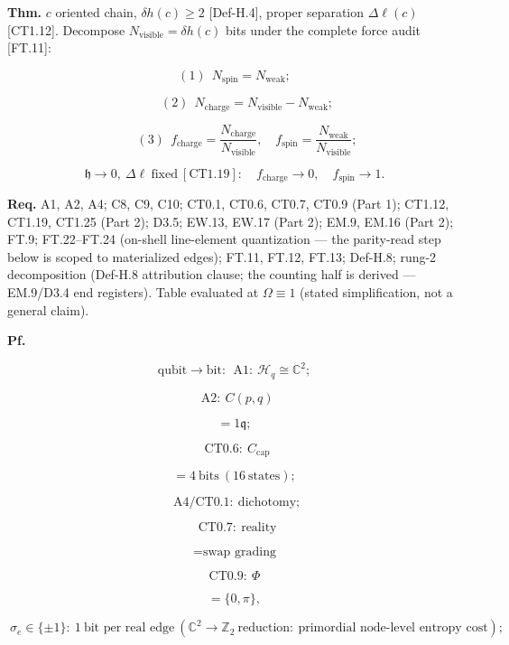 \begin{theorem}\label{tag:FT-14}
\textbf{Thm.} $c$ oriented chain, $\delta h(c)\ge2$ [Def-H.4], proper separation $\Delta\ell(c)$ [CT1.12]. Decompose $N_{\mathrm{visible}}=\delta h(c)$ bits under the complete force audit [FT.11]:

\[
(1)\ \ N_{\mathrm{spin}}=N_{\mathrm{weak}};
\]

\[
\qquad (2)\ \ N_{\mathrm{charge}}=N_{\mathrm{visible}}-N_{\mathrm{weak}};
\]

\[
\qquad (3)\ \ f_{\mathrm{charge}}=\frac{N_{\mathrm{charge}}}{N_{\mathrm{visible}}},\quad f_{\mathrm{spin}}=\frac{N_{\mathrm{weak}}}{N_{\mathrm{visible}}};
\]

\[
\mathfrak h\to0,\ \Delta\ell\ \text{fixed}\ [\mathrm{CT1.19}]:\quad f_{\mathrm{charge}}\to0,\quad f_{\mathrm{spin}}\to1 .
\]

\textbf{Req.} A1, A2, A4; C8, C9, C10; CT0.1, CT0.6, CT0.7, CT0.9 (Part 1); CT1.12, CT1.19, CT1.25 (Part 2); D3.5; EW.13, EW.17 (Part 2); EM.9, EM.16 (Part 2); FT.9; FT.22–FT.24 (on-shell line-element quantization — the parity-read step below is scoped to materialized edges); FT.11, FT.12, FT.13; Def-H.8; rung-2 decomposition (Def-H.8 attribution clause; the counting half is derived — EM.9/D3.4 end registers). Table evaluated at $\Omega\equiv1$ (stated simplification, not a general claim).

\textbf{Pf.}

\[
\text{qubit}\to\text{bit}:\ \ \mathrm{A1}:\ \mathcal H_q\cong\mathbb C^2;
\]

\[
\ \ \mathrm{A2}:\ C(p,q)
\]

\[
= 1\mathfrak q;
\]

\[
\ \ \mathrm{CT0.6}:\ C_{\mathrm{cap}}
\]

\[
= 4\ \text{bits}\ (16\ \text{states});
\]

\[
\ \ \mathrm{A4}/\mathrm{CT0.1}:\ \text{dichotomy};
\]

\[
\ \ \mathrm{CT0.7}:\ \text{reality}
\]

\[
= \text{swap grading}
\]

\[
\mathrm{CT0.9}:\ \Phi
\]

\[
= \{0,\pi\},
\]

\[
\ \sigma_e\in\{\pm1\}:\ 1\ \text{bit per real edge}\ (\mathbb C^2\to\mathbb Z_2\ \text{reduction}:\ \text{primordial node-level entropy cost});
\]


\end{theorem}
